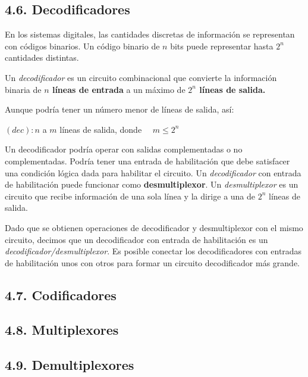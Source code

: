 \subsection*{4.6. Decodificadores}
En los sistemas digitales, las cantidades discretas de informaci\'{o}n se representan con c\'{o}digos binarios.
Un c\'{o}digo binario de $n$ bits puede representar hasta $2^n$ cantidades distintas.
\begin{center}
    Un \textit{decodificador} es un circuito combinacional que convierte la informaci\'{o}n binaria de \textbf{$n$ l\'{i}neas
    de entrada} a un m\'{a}ximo de \textbf{$2^n$ l\'{i}neas de salida.}
\end{center}
\begin{flushleft}
    Aunque podr\'{i}a tener un n\'{u}mero menor de l\'{i}neas de salida, as\'{i}: \\
    \begin{center}
        $(dec): n$ a $m$ l\'{i}neas de salida, donde $\quad m \leq 2^n$
    \end{center}
\end{flushleft}

Un decodificador podr\'{i}a operar con salidas complementadas o no complementadas. Podr\'{i}a tener
una entrada de habilitaci\'{o}n que debe satisfacer una condici\'{o}n l\'{o}gica dada para habilitar
el circuito. Un \textit{decodificador} con entrada de habilitaci\'{o}n puede funcionar como \textbf{desmultiplexor}.
Un \textit{desmultiplexor} es un circuito que recibe informaci\'{o}n de una sola l\'{i}nea y la dirige a una
de $2^n$ l\'{i}neas de salida.

Dado que se obtienen operaciones de decodificador y desmultiplexor con el mismo circuito, decimos que un
decodificador con entrada de habilitaci\'{o}n es un \textit{decodificador/desmultiplexor}.
Es posible conectar los decodificadores con entradas de habilitaci\'{o}n unos con otros para formar un circuito
decodificador m\'{a}s grande.

\subsection*{4.7. Codificadores}

\subsection*{4.8. Multiplexores}

\subsection*{4.9. Demultiplexores}